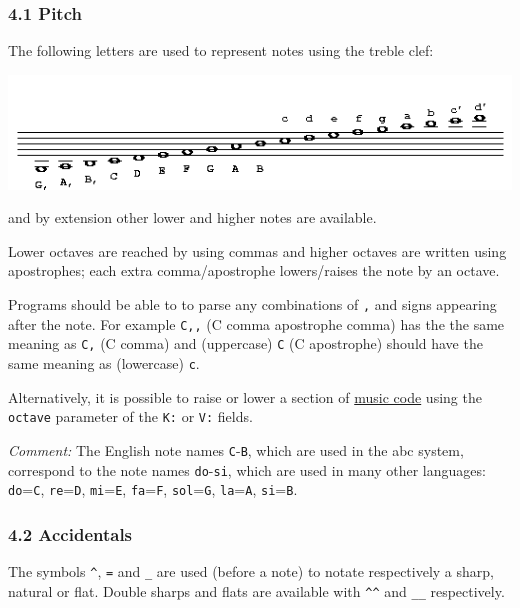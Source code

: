 \documentclass[oneside]{book}
\begin{document}
\hypertarget{pitch}{\subsubsection{4.1 Pitch}\label{pitch}}

The following letters are used to represent notes using the treble clef:

\href{/wiki/_detail/abc:standard:pitches.0000.png?id=abc\%3Astandard\%3Av2.1}{\includegraphics{wiki/_media/abc-standard-pitches.0000.png}}

and by extension other lower and higher notes are available.

Lower octaves are reached by using commas and higher octaves are written
using apostrophes; each extra comma/apostrophe lowers/raises the note by
an octave.

Programs should be able to to parse any combinations of \texttt{,} and
\texttt{\textquotesingle{}} signs appearing after the note. For example
\texttt{C,\textquotesingle{},} (C comma apostrophe comma) has the the
same meaning as \texttt{C,} (C comma) and (uppercase)
\texttt{C\textquotesingle{}} (C apostrophe) should have the same meaning
as (lowercase) \texttt{c}.

Alternatively, it is possible to raise or lower a section of
\protect\hyperlink{music_code_definition}{music code} using the
\texttt{octave} parameter of the \texttt{K:} or \texttt{V:} fields.

\emph{Comment:} The English note names \texttt{C}-\texttt{B}, which are
used in the abc system, correspond to the note names
\texttt{do}-\texttt{si}, which are used in many other languages:
\texttt{do}=\texttt{C}, \texttt{re}=\texttt{D}, \texttt{mi}=\texttt{E},
\texttt{fa}=\texttt{F}, \texttt{sol}=\texttt{G}, \texttt{la}=\texttt{A},
\texttt{si}=\texttt{B}.

\hypertarget{accidentals}{\subsubsection{4.2
Accidentals}\label{accidentals}}

The symbols \texttt{\^{}}, \texttt{=} and \texttt{\_} are used (before a
note) to notate respectively a sharp, natural or flat. Double sharps and
flats are available with \texttt{\^{}\^{}} and \texttt{\_\_}
respectively.
\end{document}
